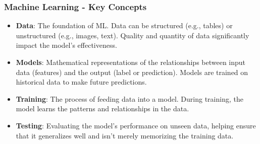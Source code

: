 \documentclass{beamer}
\begin{document}
\begin{frame}[fragile]
    \frametitle{Machine Learning - Key Concepts}

    \begin{itemize}
        \item \textbf{Data}: The foundation of ML. Data can be structured (e.g., tables) or unstructured (e.g., images, text). Quality and quantity of data significantly impact the model's effectiveness.
        
        \item \textbf{Models}: Mathematical representations of the relationships between input data (features) and the output (label or prediction). Models are trained on historical data to make future predictions.
        
        \item \textbf{Training}: The process of feeding data into a model. During training, the model learns the patterns and relationships in the data.
        
        \item \textbf{Testing}: Evaluating the model's performance on unseen data, helping ensure that it generalizes well and isn’t merely memorizing the training data.
    \end{itemize}
\end{frame}
\end{document}
